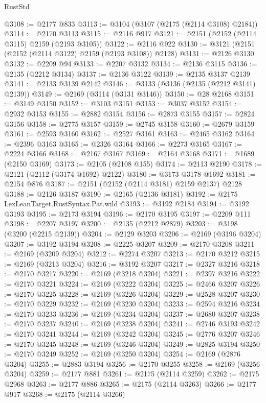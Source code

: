 \begin{lexlean}{RustStd}
\begin{coremodule}
@3108 := @2177 @833
@3113 := @3104 (@3107 (@2175 (@2114 @3108) @2184))
@3114 := @2170 @3113
@3115 := @2116 @917
@3121 := @2151 (@2152 (@2114 @3115) @2159 (@2193 @3105))
@3122 := @2116 @922
@3130 := @3121 (@2151 (@2152 (@2114 @3122) @2159 (@2193 @3108)) @2128)
@3131 := @2126 @3130
@3132 := @2209 @94
@3133 := @2207 @3132
@3134 := @2136 @3115
@3136 := @2135 (@2212 @3134)
@3137 := @2136 @3122
@3139 := @2135 @3137 @2139
@3141 := @2133 @3139 @2142
@3146 := @3133 (@3136 (@2135 (@2212 @3141) @2139))
@3149 := @2169 (@3114 (@3131 @3146))
@3150 := @28 @2168
@3151 := @3149 @3150
@3152 := @3103 @3151
@3153 := @3037 @3152
@3154 := @2932 @3153
@3155 := @2882 @3154
@3156 := @2873 @3155
@3157 := @2824 @3156
@3158 := @2775 @3157
@3159 := @2745 @3158
@3160 := @2679 @3159
@3161 := @2593 @3160
@3162 := @2527 @3161
@3163 := @2465 @3162
@3164 := @2396 @3163
@3165 := @2326 @3164
@3166 := @2273 @3165
@3167 := @2224 @3166
@3168 := @2167 @3167
@3169 := @2164 @3168
@3171 := @1689 (@2150 @3169)
@3173 := @2105 (@2108 @155)
@3174 := @2113 @2190
@3178 := @2121 (@2112 (@3174 @1692) @2122)
@3180 := @3173 @3178 @1692
@3181 := @2154 @876
@3187 := @2151 (@2152 (@2114 @3181) @2159 @2137) @2128
@3188 := @2126 @3187
@3190 := @2165 (@2136 @3181)
@3192 := @2175 LexLeanTarget.RustSyntax.Pat.wild
@3193 := @3192 @2184
@3194 := @3192 @3193
@3195 := @2173 @3194
@3196 := @2170 @3195
@3197 := @2209 @111
@3198 := @2207 @3197
@3200 := @2135 (@2212 @2879)
@3203 := @3198 (@3200 (@2215 @2139))
@3204 := @2129 @3203
@3206 := @2169 (@3196 @3204)
@3207 := @3192 @3194
@3208 := @2225 @3207
@3209 := @2170 @3208
@3211 := @2169 (@3209 @3204)
@3212 := @2274 @3207
@3213 := @2170 @3212
@3215 := @2169 (@3213 @3204)
@3216 := @3192 @3207
@3217 := @2327 @3216
@3218 := @2170 @3217
@3220 := @2169 (@3218 @3204)
@3221 := @2397 @3216
@3222 := @2170 @3221
@3224 := @2169 (@3222 @3204)
@3225 := @2466 @3207
@3226 := @2170 @3225
@3228 := @2169 (@3226 @3204)
@3229 := @2528 @3207
@3230 := @2170 @3229
@3232 := @2169 (@3230 @3204)
@3233 := @2594 @3216
@3234 := @2170 @3233
@3236 := @2169 (@3234 @3204)
@3237 := @2680 @3207
@3238 := @2170 @3237
@3240 := @2169 (@3238 @3204)
@3241 := @2746 @3193
@3242 := @2170 @3241
@3244 := @2169 (@3242 @3204)
@3245 := @2776 @3207
@3246 := @2170 @3245
@3248 := @2169 (@3246 @3204)
@3249 := @2825 @3194
@3250 := @2170 @3249
@3252 := @2169 (@3250 @3204)
@3254 := @2169 (@2876 @3204)
@3255 := @2883 @3194
@3256 := @2170 @3255
@3258 := @2169 (@3256 @3204)
@3259 := @2177 @881
@3261 := @2175 (@2114 @3259)
@3262 := @2175 @2968
@3263 := @2177 @886
@3265 := @2175 (@2114 @3263)
@3266 := @2177 @917
@3268 := @2175 (@2114 @3266)

\end{coremodule}
\end{lexlean}
